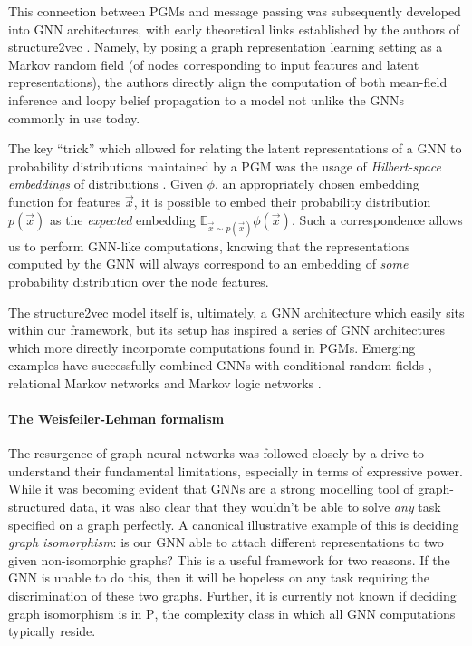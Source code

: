 This connection between PGMs and message passing was subsequently developed into GNN architectures, with early theoretical links established by the authors of structure2vec \citep{dai2016discriminative}. Namely, by posing a graph representation learning setting as a Markov random field (of nodes corresponding to input features and latent representations), the authors directly align the computation of both mean-field inference and loopy belief propagation to a model not unlike the GNNs commonly in use today. 

The key ``trick'' which allowed for relating the latent representations of a GNN to probability distributions maintained by a PGM was the usage of \emph{Hilbert-space embeddings} of distributions \citep{smola2007hilbert}. Given $\phi$, an appropriately chosen embedding function for features $\vec{x}$, it is possible to embed their probability distribution $p(\vec{x})$ as the \emph{expected} embedding $\mathbb{E}_{\vec{x}\sim p(\vec{x})}\phi(\vec{x})$. Such a correspondence allows us to perform GNN-like computations, knowing that the representations computed by the GNN will always correspond to an embedding of \emph{some} probability distribution over the node features.

The structure2vec model itself is, ultimately, a GNN architecture which easily sits within our framework, but its setup has inspired a series of GNN architectures which more directly incorporate computations found in PGMs. Emerging examples have successfully combined GNNs with conditional random fields \citep{gao2019conditional,spalevic2020hierachial}, relational Markov networks \citep{qu2019gmnn} and Markov logic networks \citep{zhang2020efficient}.

\paragraph{The Weisfeiler-Lehman formalism} The resurgence of graph neural networks was followed closely by a drive to understand their fundamental limitations, especially in terms of expressive power. While it was becoming evident that GNNs are a strong modelling tool of graph-structured data, it was also clear that they wouldn't be able to solve \emph{any} task specified on a graph perfectly. A canonical illustrative example of this is deciding \emph{graph isomorphism}: is our GNN able to attach different representations to two given non-isomorphic graphs? This is a useful framework for two reasons. If the GNN is unable to do this, then it will be hopeless on any task requiring the discrimination of these two graphs. Further, it is currently not known if deciding graph isomorphism is in \textsc{P}, the complexity class in which all GNN computations typically reside.

